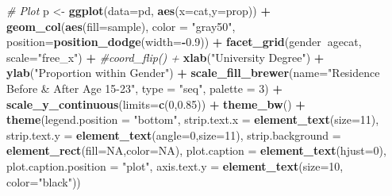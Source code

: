 \documentclass[
]{article}
\newenvironment{Shaded}{\begin{snugshade}}{\end{snugshade}}
\newcommand{\CommentTok}[1]{\textcolor[rgb]{0.56,0.35,0.01}{\textit{#1}}}
\newcommand{\DataTypeTok}[1]{\textcolor[rgb]{0.13,0.29,0.53}{#1}}
\newcommand{\DecValTok}[1]{\textcolor[rgb]{0.00,0.00,0.81}{#1}}
\newcommand{\FloatTok}[1]{\textcolor[rgb]{0.00,0.00,0.81}{#1}}
\newcommand{\KeywordTok}[1]{\textcolor[rgb]{0.13,0.29,0.53}{\textbf{#1}}}
\newcommand{\NormalTok}[1]{#1}
\newcommand{\OperatorTok}[1]{\textcolor[rgb]{0.81,0.36,0.00}{\textbf{#1}}}
\newcommand{\OtherTok}[1]{\textcolor[rgb]{0.56,0.35,0.01}{#1}}
\newcommand{\StringTok}[1]{\textcolor[rgb]{0.31,0.60,0.02}{#1}}
\begin{document}
\begin{Shaded}
\begin{Highlighting}[]
\CommentTok{# Plot}
\NormalTok{p <-}\StringTok{ }\KeywordTok{ggplot}\NormalTok{(}\DataTypeTok{data=}\NormalTok{pd, }\KeywordTok{aes}\NormalTok{(}\DataTypeTok{x=}\NormalTok{cat,}\DataTypeTok{y=}\NormalTok{prop)) }\OperatorTok{+}\StringTok{ }
\StringTok{  }\KeywordTok{geom_col}\NormalTok{(}\KeywordTok{aes}\NormalTok{(}\DataTypeTok{fill=}\NormalTok{sample), }\DataTypeTok{color =} \StringTok{"gray50"}\NormalTok{, }\DataTypeTok{position=}\KeywordTok{position_dodge}\NormalTok{(}\DataTypeTok{width=}\OperatorTok{-}\FloatTok{0.9}\NormalTok{)) }\OperatorTok{+}\StringTok{  }
\StringTok{  }\KeywordTok{facet_grid}\NormalTok{(gender}\OperatorTok{~}\NormalTok{agecat, }\DataTypeTok{scale=}\StringTok{"free_x"}\NormalTok{) }\OperatorTok{+}
\StringTok{  }\CommentTok{#coord_flip() + }
\StringTok{  }\KeywordTok{xlab}\NormalTok{(}\StringTok{"University Degree"}\NormalTok{) }\OperatorTok{+}\StringTok{ }\KeywordTok{ylab}\NormalTok{(}\StringTok{"Proportion within Gender"}\NormalTok{) }\OperatorTok{+}
\StringTok{  }\KeywordTok{scale_fill_brewer}\NormalTok{(}\DataTypeTok{name=}\StringTok{"Residence Before & After Age 15-23"}\NormalTok{, }\DataTypeTok{type =} \StringTok{"seq"}\NormalTok{, }\DataTypeTok{palette =} \DecValTok{3}\NormalTok{) }\OperatorTok{+}\StringTok{ }
\StringTok{  }\KeywordTok{scale_y_continuous}\NormalTok{(}\DataTypeTok{limits=}\KeywordTok{c}\NormalTok{(}\DecValTok{0}\NormalTok{,}\FloatTok{0.85}\NormalTok{)) }\OperatorTok{+}
\StringTok{  }\KeywordTok{theme_bw}\NormalTok{() }\OperatorTok{+}\StringTok{ }
\StringTok{  }\KeywordTok{theme}\NormalTok{(}\DataTypeTok{legend.position =} \StringTok{"bottom"}\NormalTok{,}
        \DataTypeTok{strip.text.x =} \KeywordTok{element_text}\NormalTok{(}\DataTypeTok{size=}\DecValTok{11}\NormalTok{),}
        \DataTypeTok{strip.text.y =} \KeywordTok{element_text}\NormalTok{(}\DataTypeTok{angle=}\DecValTok{0}\NormalTok{,}\DataTypeTok{size=}\DecValTok{11}\NormalTok{),}
        \DataTypeTok{strip.background =} \KeywordTok{element_rect}\NormalTok{(}\DataTypeTok{fill=}\OtherTok{NA}\NormalTok{,}\DataTypeTok{color=}\OtherTok{NA}\NormalTok{),}
        \DataTypeTok{plot.caption =} \KeywordTok{element_text}\NormalTok{(}\DataTypeTok{hjust=}\DecValTok{0}\NormalTok{),}
        \DataTypeTok{plot.caption.position =} \StringTok{"plot"}\NormalTok{,}
        \DataTypeTok{axis.text.y =} \KeywordTok{element_text}\NormalTok{(}\DataTypeTok{size=}\DecValTok{10}\NormalTok{, }\DataTypeTok{color=}\StringTok{"black"}\NormalTok{))}
\end{Highlighting}
\end{Shaded}
\end{document}
